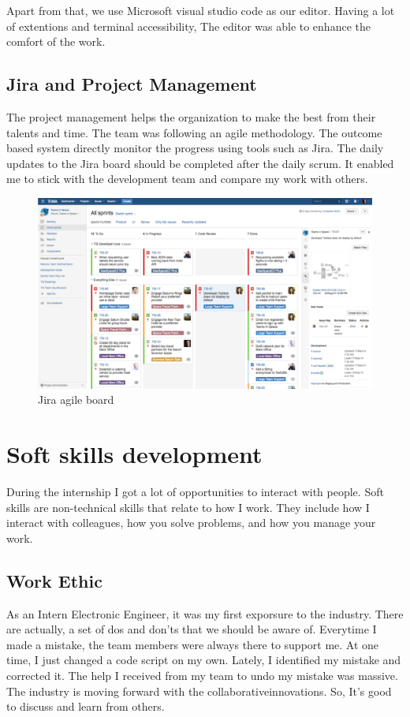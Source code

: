 \documentclass[twoside,12pt,times,onecolumn,a4paper]{report}
\begin{document}
Apart from that, we use Microsoft visual studio code as our editor. Having a lot of extentions and terminal accessibility, The editor was able to enhance the comfort of the work. 

\section{ Jira and Project Management}

The project management helps the organization to make the best from their talents and time. The team was following an agile methodology. The outcome based system directly monitor the progress using tools such as Jira. The daily updates to the Jira board should be completed after the daily scrum. It enabled me to stick with the development team and compare my work with others. 

\begin{figure}[H]
  \centering
   \includegraphics[width=15cm]{jira}
  \caption{Jira agile board}
\end{figure}


\chapter{Soft skills development}

During the internship I got a lot of opportunities to interact with people. Soft skills are non-technical skills that relate to how I work. They include how I interact with colleagues, how you solve problems, and how you manage your work.

\section{Work Ethic}
As an Intern Electronic Engineer, it was my first exporsure to the industry. There are actually, a set of dos and don'ts that we should be aware of. Everytime I made a mistake, the team members were always there to support me. At one time, I just changed a code script on my own. Lately, I identified my mistake and corrected it. The help I received from my team to undo my mistake was massive. The industry is moving forward with the collaborativeinnovations. So, It's good to discuss and learn from others.  
\end{document}
